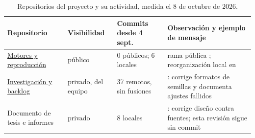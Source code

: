 \begin{table}[htbp]
\centering
\caption{Repositorios del proyecto y su actividad, medida el 8 de octubre de 2026.}
\label{tab:repos}
\footnotesize
\begin{tabular}{L{3.4cm}L{1.75cm}L{2.1cm}L{5.0cm}}
\toprule
Repositorio & Visibilidad & Commits desde 4 sept. & Observación y ejemplo de mensaje \\
\midrule
\href{https://github.com/cowerino/dwnominate-chile}{Motores y reproducción} &
público & 0 públicos; 6 locales & rama pública ; reorganización local en  \\
\addlinespace
\href{https://github.com/quevotan/quevotan-db/commits/fc25b1c9302cfd7b35a265357c203f21848983b6}{Investigación y backlog} &
privado, del equipo & 37 remotos, sin fusiones & : corrige formatos de semillas y documenta ajustes fallidos \\
\addlinespace
Documento de tesis e informes & privado & 8 locales & : corrige diseño contra fuentes; esta revisión sigue sin commit \\
\bottomrule
\end{tabular}
\end{table}
